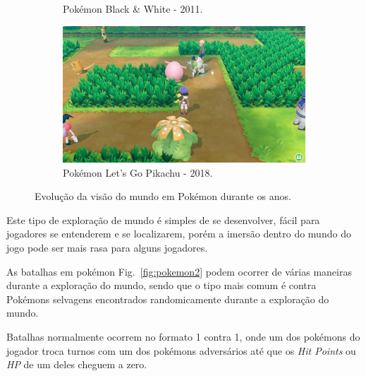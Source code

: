 \documentclass[
	12pt,				%
	openright,			%
	twoside,			%
	a4paper,			%
	english,			%
	french,				%
	spanish,			%
	brazil				%
	]{abntex2}
\begin{document}
\begin{figure}[h!]
\begin{subfigure}[b]{0.49\linewidth}
    \caption{Pokémon Black \& White - 2011.}
  \end{subfigure}
  \begin{subfigure}[b]{0.49\linewidth}
    \includegraphics[width=\linewidth]{lgpikachu.jpg}
    \caption{Pokémon Let’s Go Pikachu - 2018.}
  \end{subfigure}
  \caption{Evolução da visão do mundo em Pokémon durante os anos.}
  \label{fig:pokemon}
\end{figure}

Este tipo de exploração de mundo é simples de se desenvolver, fácil para jogadores se entenderem e se localizarem, porém a imersão dentro do mundo do jogo pode ser mais rasa para alguns jogadores.

	As batalhas em pokémon Fig.~\ref{fig:pokemon2} podem ocorrer de várias maneiras durante a exploração do mundo, sendo que o tipo mais comum é contra Pokémons selvagens encontrados randomicamente durante a exploração do mundo.

	Batalhas normalmente ocorrem no formato 1 contra 1, onde um dos pokémons do jogador troca turnos com um dos pokémons adversários até que os \emph{Hit Points} ou \emph{HP} de um deles cheguem a zero.
\end{document}
